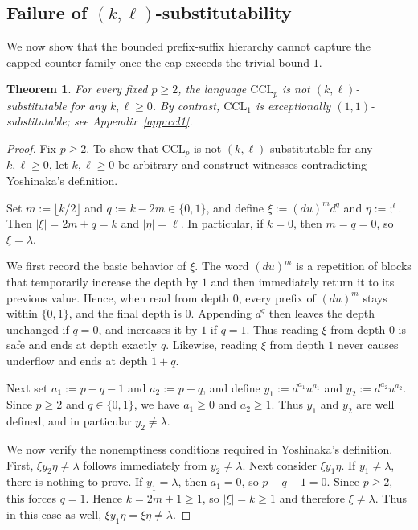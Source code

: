 \documentclass[11pt,a4paper]{article}
\newtheorem{theorem}{Theorem}[section]
\begin{document}
\subsection{Failure of \texorpdfstring{$(k,\ell)$}{(k,l)}-substitutability}

We now show that the bounded prefix-suffix hierarchy cannot capture the capped-counter family once the cap exceeds the trivial bound $1$.

\begin{theorem}\label{thm:cclp-non-kl}
For every fixed $p\ge2$, the language $\mathrm{CCL}_p$ is not $(k,\ell)$-substitutable for any $k,\ell\ge0$. By contrast, $\mathrm{CCL}_1$ is exceptionally $(1,1)$-substitutable; see Appendix~\ref{app:ccl1}.
\end{theorem}

\begin{proof}
Fix $p \ge 2$. To show that $\mathrm{CCL}_p$ is not $(k,\ell)$-substitutable for any $k,\ell \ge 0$, let $k,\ell \ge 0$ be arbitrary and construct witnesses contradicting Yoshinaka's definition.

Set $m := \lfloor k/2 \rfloor$ and $q := k-2m \in \{0,1\}$, and define $\xi := (du)^m d^q$ and $\eta := ;^\ell$. Then $|\xi| = 2m+q = k$ and $|\eta| = \ell$. In particular, if $k=0$, then $m=q=0$, so $\xi = \lambda$.

We first record the basic behavior of $\xi$. The word $(du)^m$ is a repetition of blocks that temporarily increase the depth by $1$ and then immediately return it to its previous value. Hence, when read from depth $0$, every prefix of $(du)^m$ stays within $\{0,1\}$, and the final depth is $0$. Appending $d^q$ then leaves the depth unchanged if $q=0$, and increases it by $1$ if $q=1$. Thus reading $\xi$ from depth $0$ is safe and ends at depth exactly $q$. Likewise, reading $\xi$ from depth $1$ never causes underflow and ends at depth $1+q$.

Next set $a_1 := p-q-1$ and $a_2 := p-q$, and define $y_1 := d^{a_1}u^{a_1}$ and $y_2 := d^{a_2}u^{a_2}$. Since $p \ge 2$ and $q \in \{0,1\}$, we have $a_1 \ge 0$ and $a_2 \ge 1$. Thus $y_1$ and $y_2$ are well defined, and in particular $y_2 \neq \lambda$.

We now verify the nonemptiness conditions required in Yoshinaka's definition. First, $\xi y_2 \eta \neq \lambda$ follows immediately from $y_2 \neq \lambda$. Next consider $\xi y_1 \eta$. If $y_1 \neq \lambda$, there is nothing to prove. If $y_1 = \lambda$, then $a_1=0$, so $p-q-1=0$. Since $p \ge 2$, this forces $q=1$. Hence $k=2m+1 \ge 1$, so $|\xi|=k \ge 1$ and therefore $\xi \neq \lambda$. Thus in this case as well, $\xi y_1 \eta = \xi \eta \neq \lambda$.


\end{proof}
\end{document}
